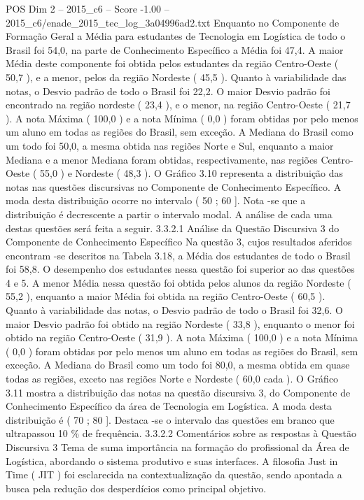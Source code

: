 \begin{textsample}{POS Dim 2 – 2015\_c6 – Score -1.00 – 2015\_c6/enade\_2015\_tec\_log\_3a04996ad2.txt}
Enquanto no Componente de Formação Geral a Média para estudantes de Tecnologia em Logística de todo o Brasil foi 54,0, na parte de Conhecimento Específico a Média foi 47,4.
A maior Média deste componente foi obtida pelos estudantes da região Centro-Oeste ( 50,7 ), e a menor, pelos da região Nordeste ( 45,5 ).
Quanto à variabilidade das notas, o Desvio padrão de todo o Brasil foi 22,2.
O maior Desvio padrão foi encontrado na região nordeste ( 23,4 ), e o menor, na região Centro-Oeste ( 21,7 ).
A nota Máxima ( 100,0 ) e a nota Mínima ( 0,0 ) foram obtidas por pelo menos um aluno em todas as regiões do Brasil, sem exceção.
A Mediana do Brasil como um todo foi 50,0, a mesma obtida nas regiões Norte e Sul, enquanto a maior Mediana e a menor Mediana foram obtidas, respectivamente, nas regiões Centro-Oeste ( 55,0 ) e Nordeste ( 48,3 ).
O Gráfico 3.10 representa a distribuição das notas nas questões discursivas no Componente de Conhecimento Específico.
A moda desta distribuição ocorre no intervalo ( 50 ; 60 ].
Nota -se que a distribuição é decrescente a partir o intervalo modal.
A análise de cada uma destas questões será feita a seguir. 3.3.2.1 Análise da Questão Discursiva 3 do Componente de Conhecimento Específico Na questão 3, cujos resultados aferidos encontram -se descritos na Tabela 3.18, a Média dos estudantes de todo o Brasil foi 58,8.
O desempenho dos estudantes nessa questão foi superior ao das questões 4 e 5.
A menor Média nessa questão foi obtida pelos alunos da região Nordeste ( 55,2 ), enquanto a maior Média foi obtida na região Centro-Oeste ( 60,5 ).
Quanto à variabilidade das notas, o Desvio padrão de todo o Brasil foi 32,6.
O maior Desvio padrão foi obtido na região Nordeste ( 33,8 ), enquanto o menor foi obtido na região Centro-Oeste ( 31,9 ).
A nota Máxima ( 100,0 ) e a nota Mínima ( 0,0 ) foram obtidas por pelo menos um aluno em todas as regiões do Brasil, sem exceção.
A Mediana do Brasil como um todo foi 80,0, a mesma obtida em quase todas as regiões, exceto nas regiões Norte e Nordeste ( 60,0 cada ).
O Gráfico 3.11 mostra a distribuição das notas na questão discursiva 3, do Componente de Conhecimento Específico da área de Tecnologia em Logística.
A moda desta distribuição é ( 70 ; 80 ].
Destaca -se o intervalo das questões em branco que ultrapassou 10 \% de frequência. 3.3.2.2 Comentários sobre as respostas à Questão Discursiva 3 Tema de suma importância na formação do profissional da Área de Logística, abordando o sistema produtivo e suas interfaces.
A filosofia Just in Time ( JIT ) foi esclarecida na contextualização da questão, sendo apontada a busca pela redução dos desperdícios como principal objetivo.

\end{textsample}
